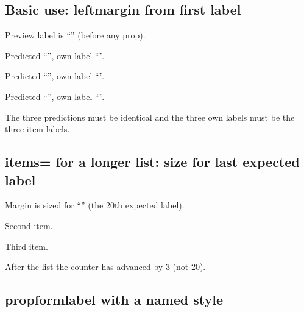 \documentclass{article}
\begin{document}
\subsection{Basic use: leftmargin from first label}


Preview label is ``\proppredictedlabel'' (before any prop).

\begin{prop}[leftmargin=\widthof{\proppredictedlabel}+0.5em]
  \item Predicted ``\proppredictedlabel'', own label ``\propformlabel''. \label{pfl:1}
  \item Predicted ``\proppredictedlabel'', own label ``\propformlabel''. \label{pfl:2}
  \item Predicted ``\proppredictedlabel'', own label ``\propformlabel''. \label{pfl:3}
\end{prop}

The three predictions must be identical and the three own labels must be the
three item labels.

\subsection{items= for a longer list: size for last expected label}


\begin{prop}[items=20, leftmargin=\widthof{\proppredictedlabel}+0.5em]
  \item Margin is sized for ``\proppredictedlabel'' (the 20th expected label). \label{pfl:long1}
  \item Second item. \label{pfl:long2}
  \item Third item. \label{pfl:long3}
\end{prop}

After the list the counter has advanced by 3 (not 20).

\subsection{propformlabel with a named style}
\end{document}
